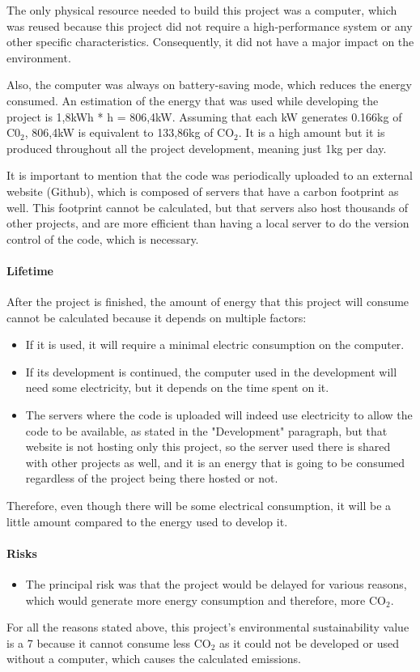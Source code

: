 The only physical resource needed to build this project was a computer, which was reused because this project did not require a high-performance system or any other specific characteristics. Consequently, it did not have a major impact on the environment.

Also, the computer was always on battery-saving mode, which reduces the energy consumed. An estimation of the energy that was used while developing the project is 1,8kWh * \the\value{totalFinalHours} h = 806,4kW. Assuming that each kW generates 0.166kg of C0$_2$, 806,4kW is equivalent to 133,86kg of CO$_2$. It is a high amount but it is produced throughout all the project development, meaning just 1kg per day.

It is important to mention that the code was periodically uploaded to an external website (Github), which is composed of servers that have a carbon footprint as well. This footprint cannot be calculated, but that servers also host thousands of other projects, and are more efficient than having a local server to do the version control of the code, which is necessary.

\paragraph{Lifetime}
After the project is finished, the amount of energy that this project will consume cannot be calculated because it depends on multiple factors:
\begin{itemize}
\item If it is used, it will require a minimal electric consumption on the computer.
\item If its development is continued, the computer used in the development will need some electricity, but it depends on the time spent on it.
\item The servers where the code is uploaded will indeed use electricity to allow the code to be available, as stated in the "Development" paragraph, but that website is not hosting only this project, so the server used there is shared with other projects as well, and it is an energy that is going to be consumed regardless of the project being there hosted or not. 
\end{itemize}

Therefore, even though there will be some electrical consumption, it will be a little amount compared to the energy used to develop it.

\paragraph{Risks}
\begin{itemize}
\item The principal risk was that the project would be delayed for various reasons, which would generate more energy consumption and therefore, more CO$_2$.
\end{itemize}

For all the reasons stated above, this project's environmental sustainability value is a 7 because it cannot consume less CO$_2$ as it could not be developed or used without a computer, which causes the calculated emissions. 
